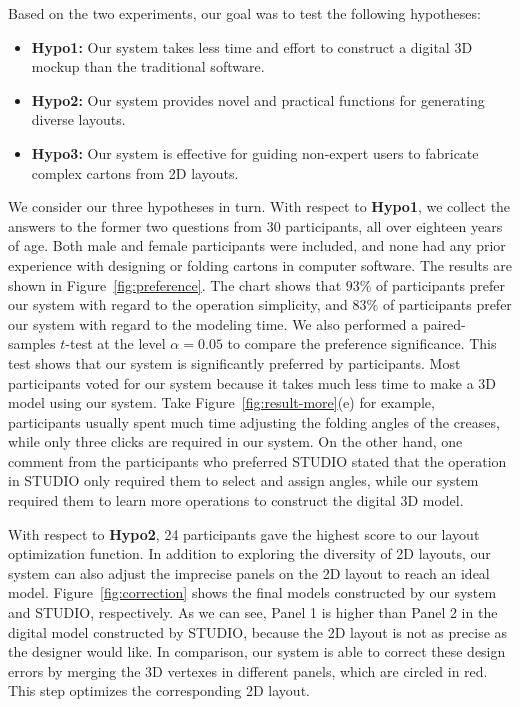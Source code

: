 Based on the two experiments, our goal was to test the following hypotheses:

\begin{itemize}
	\item \textbf{Hypo1:} Our system takes less time and effort to construct a digital 3D mockup than the traditional software.
	\item \textbf{Hypo2:} Our system provides novel and practical functions for generating diverse layouts.
	\item \textbf{Hypo3:} Our system is effective for guiding non-expert users to fabricate complex cartons from 2D layouts.
\end{itemize}




We consider our three hypotheses in turn. 
With respect to \textbf{Hypo1}, we collect the answers to the former two questions from 30 participants, all over eighteen years of age. Both male and female participants were included, and none had any prior experience with designing or folding cartons in computer software. 
%
The results are shown in Figure~\ref{fig:preference}. 
The chart shows that $93\%$ of participants prefer our system with regard to the operation simplicity, and $83\%$ of participants prefer our system with regard to the modeling time.
%
We also performed a paired-samples $t$-test at the level $\alpha = 0.05$ to compare the preference significance.
%
This test shows that our system is significantly preferred by participants.
%
Most participants voted for our system because it takes much less time to make a 3D model using our system. 
Take Figure~\ref{fig:result-more}(e) for example, participants usually spent much time adjusting the folding angles of the creases, while only three clicks are required in our system.
%
On the other hand, one comment from the participants who preferred STUDIO stated that the operation in STUDIO only required them to select and assign angles, while our system required them to learn more operations to construct the digital 3D model. 
%

With respect to \textbf{Hypo2}, 24 participants gave the highest score to our layout optimization function. 
%
In addition to exploring the diversity of 2D layouts, our system can also adjust the imprecise panels on the 2D layout to reach an ideal model. Figure~\ref{fig:correction} shows the final models constructed by our system and STUDIO, respectively. As we can see, Panel 1 is higher than Panel 2 in the digital model constructed by STUDIO, because the 2D layout is not as precise as the designer would like. 
%
In comparison, our system is able to correct these design errors by merging the 3D vertexes in different panels, which are circled in red. This step optimizes the corresponding 2D layout.
 
